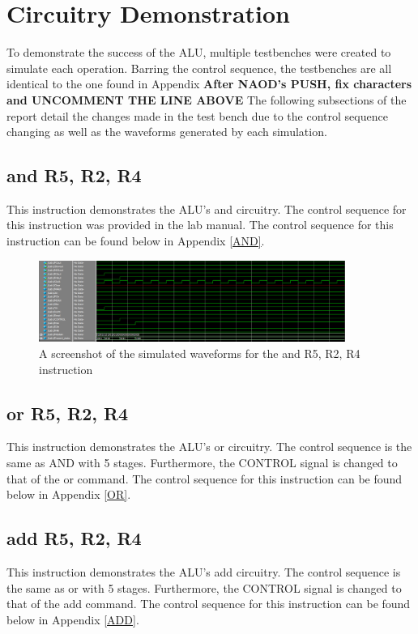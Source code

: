 \documentclass{article}
\begin{document}
\section{Circuitry Demonstration}

    To demonstrate the success of the ALU, multiple testbenches were created to simulate each operation. Barring the control sequence, the testbenches are all identical to the one found in Appendix 
    \textbf{After NAOD's PUSH, fix characters and  UNCOMMENT THE LINE ABOVE}
    The following subsections of the report detail the changes made in the test bench due to the control sequence changing as well as the waveforms generated by each simulation.

    \subsection{and R5, R2, R4}
    This instruction demonstrates the ALU's and circuitry. The control sequence for this instruction was provided in the lab manual. The control sequence for this instruction can be found below in Appendix \ref{AND}.
    
    \begin{figure}
        \begin{center}
            \includegraphics[width=10cm]{and}
            \caption{A screenshot of the simulated waveforms for the and R5, R2, R4 instruction}
        \end{center}
    \end{figure}

    \subsection{or R5, R2, R4}
     This instruction demonstrates the ALU's or circuitry. The control sequence is the same as AND with 5 stages. Furthermore, the CONTROL signal is changed to that of the or command. The control sequence for this instruction can be found below in Appendix \ref{OR}.
    \subsection{add R5, R2, R4}
     This instruction demonstrates the ALU's add circuitry. The control sequence is the same as or with 5 stages. Furthermore, the CONTROL signal is changed to that of the add command. The control sequence for this instruction can be found below in Appendix \ref{ADD}.
\end{document}
